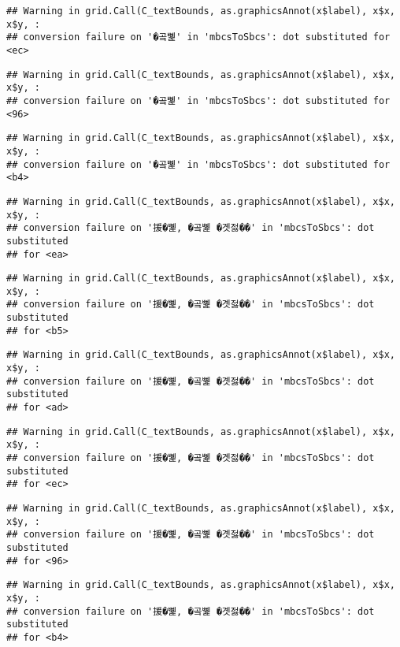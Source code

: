 \documentclass[
]{article}
\begin{document}
\begin{verbatim}
## Warning in grid.Call(C_textBounds, as.graphicsAnnot(x$label), x$x, x$y, :
## conversion failure on '�곸뼱' in 'mbcsToSbcs': dot substituted for <ec>
\end{verbatim}

\begin{verbatim}
## Warning in grid.Call(C_textBounds, as.graphicsAnnot(x$label), x$x, x$y, :
## conversion failure on '�곸뼱' in 'mbcsToSbcs': dot substituted for <96>
\end{verbatim}

\begin{verbatim}
## Warning in grid.Call(C_textBounds, as.graphicsAnnot(x$label), x$x, x$y, :
## conversion failure on '�곸뼱' in 'mbcsToSbcs': dot substituted for <b4>
\end{verbatim}

\begin{verbatim}
## Warning in grid.Call(C_textBounds, as.graphicsAnnot(x$label), x$x, x$y, :
## conversion failure on '援�뼱, �곸뼱 �곗젏��' in 'mbcsToSbcs': dot substituted
## for <ea>
\end{verbatim}

\begin{verbatim}
## Warning in grid.Call(C_textBounds, as.graphicsAnnot(x$label), x$x, x$y, :
## conversion failure on '援�뼱, �곸뼱 �곗젏��' in 'mbcsToSbcs': dot substituted
## for <b5>
\end{verbatim}

\begin{verbatim}
## Warning in grid.Call(C_textBounds, as.graphicsAnnot(x$label), x$x, x$y, :
## conversion failure on '援�뼱, �곸뼱 �곗젏��' in 'mbcsToSbcs': dot substituted
## for <ad>
\end{verbatim}

\begin{verbatim}
## Warning in grid.Call(C_textBounds, as.graphicsAnnot(x$label), x$x, x$y, :
## conversion failure on '援�뼱, �곸뼱 �곗젏��' in 'mbcsToSbcs': dot substituted
## for <ec>
\end{verbatim}

\begin{verbatim}
## Warning in grid.Call(C_textBounds, as.graphicsAnnot(x$label), x$x, x$y, :
## conversion failure on '援�뼱, �곸뼱 �곗젏��' in 'mbcsToSbcs': dot substituted
## for <96>
\end{verbatim}

\begin{verbatim}
## Warning in grid.Call(C_textBounds, as.graphicsAnnot(x$label), x$x, x$y, :
## conversion failure on '援�뼱, �곸뼱 �곗젏��' in 'mbcsToSbcs': dot substituted
## for <b4>
\end{verbatim}
\end{document}
